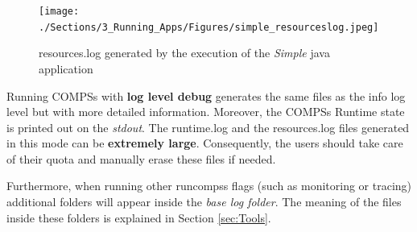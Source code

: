 \begin{figure}[h!]
  \centering
    \texttt{[image: ./Sections/3\_Running\_Apps/Figures/simple\_resourceslog.jpeg]}
    \caption{resources.log generated by the execution of the \textit{Simple} java application}
\end{figure}
\label{fig:simple_resourceslog}

Running COMPSs with \textbf{log level debug} generates the same files as the info log level but with more detailed information.
Moreover, the COMPSs Runtime state is printed out on the \textit{stdout}. The runtime.log and the resources.log
files generated in this mode can be \textbf{extremely large}. Consequently, the users should take care of their quota and manually
erase these files if needed. \newline

Furthermore, when running other runcompss flags (such as monitoring or tracing) additional folders will appear inside the 
\textit{base log folder}. The meaning of the files inside these folders is explained in Section \ref{sec:Tools}. 
